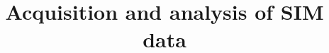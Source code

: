 \documentclass[a4paper,onecolumn,article,draft]{memoir}
\author{}
\title{Acquisition and analysis of SIM data}
\begin{document}
  \maketitle
  \begin{abstract}

  \end{abstract}

  
  

  
  
\end{document}
